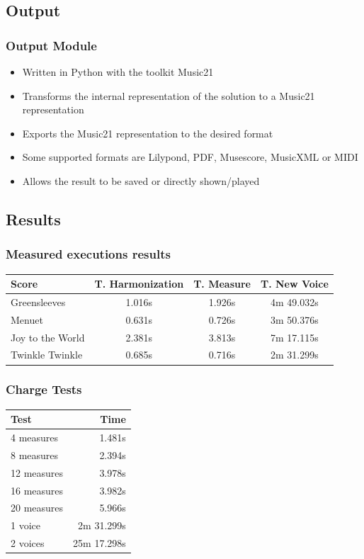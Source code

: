 \documentclass[english]{beamer}
\begin{document}
\subsection{Output}
		\begin{frame}
		\frametitle{Output Module}
			\begin{itemize}
				\item Written in Python with the toolkit Music21
				\item Transforms the internal representation of the solution to a Music21 representation
				\item Exports the Music21 representation to the desired format
				\item Some supported formats are Lilypond, PDF, Musescore, MusicXML or MIDI
				\item Allows the result to be saved or directly shown/played
			\end{itemize}
		\end{frame}
\subsection{Results}
	\begin{frame}
	\frametitle{Measured executions results}
	\begin{center}
		\begin{tabular}{ | l | c | c | c | }
			\hline
			Score 			& T. Harmonization 	& T. Measure & T. New Voice \\ \hline \hline
			Greensleeves 	& 1.016s 			& 1.926s	& 4m 49.032s \\ \hline
			Menuet 			& 0.631s 			& 0.726s 	& 3m 50.376s \\ \hline
			Joy to the World& 2.381s 			& 3.813s	& 7m 17.115s \\ \hline
			Twinkle Twinkle & 0.685s 			& 0.716s 	& 2m 31.299s \\ \hline
		\end{tabular}
	\end{center}
	\end{frame}
		\begin{frame}
		\frametitle{Charge Tests}
		\begin{center}
		\begin{center}
				\begin{tabular}{ | l | r | }
					\hline
					Test & Time \\ \hline
					4 measures  & 1.481s \\ \hline
					8 measures 	& 2.394s \\ \hline
					12 measures	& 3.978s \\ \hline
					16 measures & 3.982s \\ \hline
					20 measures & 5.966s \\ \hline
					1 voice & 2m 31.299s \\ \hline
					2 voices & 25m 17.298s  \\ \hline
				\end{tabular}
			\end{center}
		\end{center}
		\end{frame}
\end{document}
